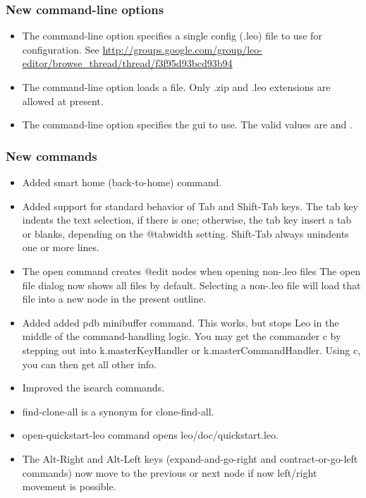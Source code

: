 \documentclass[a4paper,10pt,english]{sphinxmanual}
\begin{document}
\subsubsection{New command-line options}
\label{what-is-new:id5}\begin{itemize}
\item {} 
The  command-line option specifies a single config (.leo) file
to use for configuration.
See \href{http://groups.google.com/group/leo-editor/browse\_thread/thread/f3f95d93bcd93b94}{http://groups.google.com/group/leo-editor/browse\_thread/thread/f3f95d93bcd93b94}

\item {} 
The  command-line option loads a file.
Only .zip and .leo extensions are allowed at present.

\item {} 
The  command-line option specifies the gui to use.
The valid values are  and .

\end{itemize}


\subsubsection{New commands}
\label{what-is-new:id6}\begin{itemize}
\item {} 
Added smart home (back-to-home) command.

\item {} 
Added support for standard behavior of Tab and Shift-Tab keys.
The tab key indents the text selection, if there is one;
otherwise, the tab key insert a tab or blanks, depending on the @tabwidth setting.
Shift-Tab always unindents one or more lines.

\item {} 
The open command creates @edit nodes when opening non-.leo files
The open file dialog now shows all files by default.
Selecting a non-.leo file will load that file into a new node in the present outline.

\item {} 
Added added pdb minibuffer command.
This works, but stops Leo in the middle of the command-handling logic.
You may get the commander c by stepping out into
k.masterKeyHandler or k.masterCommandHandler.
Using c, you can then get all other info.

\item {} 
Improved the isearch commands.

\item {} 
find-clone-all is a synonym for clone-find-all.

\item {} 
open-quickstart-leo command opens leo/doc/quickstart.leo.

\item {} 
The Alt-Right and Alt-Left keys (expand-and-go-right and contract-or-go-left
commands) now move to the previous or next node if now left/right movement is
possible.

\end{itemize}
\end{document}
